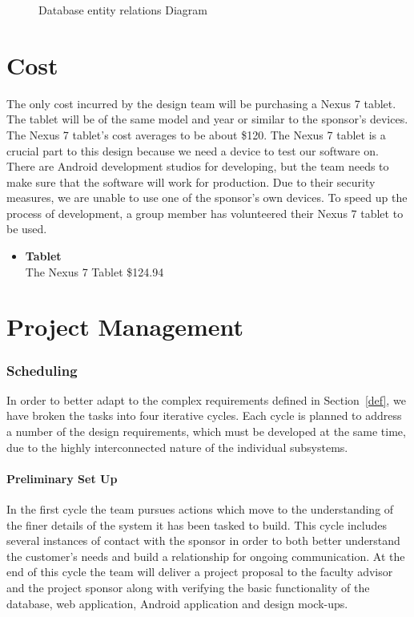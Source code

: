 \documentclass[Letter,11pt]{article}
\begin{document}
		\begin{figure}[h]
			\centering
			
			\caption{\label{ERdiogram} Database entity relations Diagram}
		\end{figure}
	

		
	
\part{Cost}
The only cost incurred by the design team will be purchasing a Nexus 7 tablet. The tablet will be of the same model and year or similar to the sponsor's devices. The Nexus 7 tablet's cost averages to be about \$120. The Nexus 7 tablet is a crucial part to this design because we need a device to test our software on. There are Android development studios for developing, but the team needs to make sure that the software will work for production.  Due to their security measures, we are unable to use one of the sponsor's own devices. To speed up the process of development, a group member has volunteered their Nexus 7 tablet to be used. \\
		\begin{itemize}
		\item \textbf{Tablet}\\
		The Nexus 7 Tablet \$124.94\\
		\end{itemize}
\part{Project Management}
\section{Scheduling}
		In order to better adapt to the complex requirements defined in Section~\ref{def}, we have broken the tasks into four iterative cycles. Each cycle is planned to address a number of the design requirements, which must be developed at the same time, due to the highly interconnected nature of the individual subsystems. 
		
		
	\subsection{Preliminary Set Up}\label{cyc1}
		In the first cycle the team pursues actions which move to the understanding of the finer details of the system it has been tasked to build. This cycle includes several instances of contact with the sponsor in order to both better understand the customer's needs and build a relationship for ongoing communication. At the end of this cycle the team will deliver a project proposal to the faculty advisor and the project sponsor along with verifying the basic functionality of the database, web application, Android application and design mock-ups. 
		
\end{document}

